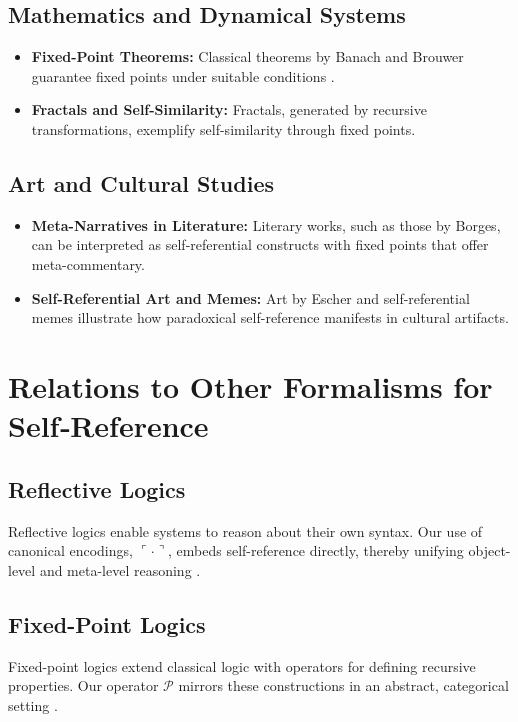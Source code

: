 \documentclass[12pt]{amsart}
\theoremstyle{plain}
\theoremstyle{definition}
\theoremstyle{remark}
\begin{document}
\subsection{Mathematics and Dynamical Systems}
\begin{itemize}
    \item \textbf{Fixed-Point Theorems:} Classical theorems by Banach and Brouwer guarantee fixed points under suitable conditions \cite{Kirk2004}.
    \item \textbf{Fractals and Self-Similarity:} Fractals, generated by recursive transformations, exemplify self-similarity through fixed points.
\end{itemize}

\subsection{Art and Cultural Studies}
\begin{itemize}
    \item \textbf{Meta-Narratives in Literature:} Literary works, such as those by Borges, can be interpreted as self-referential constructs with fixed points that offer meta-commentary.
    \item \textbf{Self-Referential Art and Memes:} Art by Escher and self-referential memes illustrate how paradoxical self-reference manifests in cultural artifacts.
\end{itemize}

\section{Relations to Other Formalisms for Self‐Reference}

\subsection{Reflective Logics}
Reflective logics enable systems to reason about their own syntax. Our use of canonical encodings, $\ulcorner \cdot \urcorner$, embeds self-reference directly, thereby unifying object-level and meta-level reasoning \cite{Lamport1978}.

\subsection{Fixed-Point Logics}
Fixed-point logics extend classical logic with operators for defining recursive properties. Our operator $\mathcal{P}$ mirrors these constructions in an abstract, categorical setting \cite{Gödel1931,Russell1908}.
\end{document}
